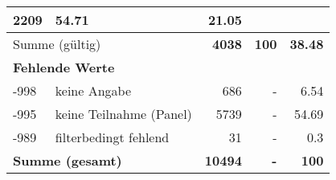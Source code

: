 \begin{longtable}{lXrrr}
       \num{2209} &
       \num[round-mode=places,round-precision=2]{54,71} &
         \num[round-mode=places,round-precision=2]{21,05} \\
     \midrule
     \multicolumn{2}{l}{Summe (gültig)} &
       \textbf{\num{4038}} &
     \textbf{100} &
       \textbf{\num[round-mode=places,round-precision=2]{38,48}} \\
     \multicolumn{5}{l}{\textbf{Fehlende Werte}}\\
       -998 &
       keine Angabe &
         \num{686} &
        - &
         \num[round-mode=places,round-precision=2]{6,54} \\
       -995 &
       keine Teilnahme (Panel) &
         \num{5739} &
        - &
         \num[round-mode=places,round-precision=2]{54,69} \\
       -989 &
       filterbedingt fehlend &
         \num{31} &
        - &
         \num[round-mode=places,round-precision=2]{0,3} \\
     \midrule
     \multicolumn{2}{l}{\textbf{Summe (gesamt)}} &
          \textbf{\num{10494}} &
        \textbf{-} &
        \textbf{100} \\
     \bottomrule
     \end{longtable}
     
